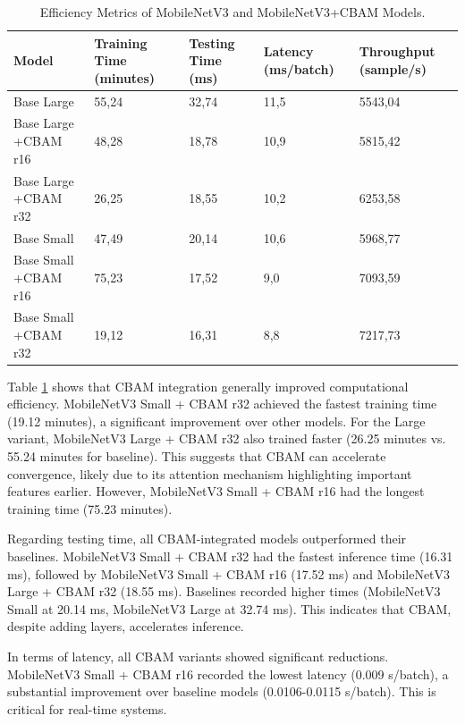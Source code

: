 \documentclass[preprint,12pt]{elsarticle}
\begin{document}
\begin{table}[t]
    \centering
    \begin{tabularx}{\textwidth}{|X|X|X|X|X|}
        \hline
        \textbf{Model} & \textbf{Training Time (minutes)} & \textbf{Testing Time (ms)} & \textbf{Latency (ms/batch)} & \textbf{Throughput (sample/s)} \\
        \hline
        Base Large & 55,24 & 32,74 & 11,5 & 5543,04 \\
        Base Large +CBAM r16 & 48,28 & 18,78 & 10,9 & 5815,42 \\
        Base Large +CBAM r32 & 26,25 & 18,55 & 10,2 & 6253,58 \\
        \hline
        Base Small & 47,49 & 20,14 & 10,6 & 5968,77 \\
        Base Small +CBAM r16 & 75,23 & 17,52 & 9,0 & 7093,59 \\
        Base Small +CBAM r32 & 19,12 & 16,31 & 8,8 & 7217,73 \\
        \hline
    \end{tabularx}
    \caption{Efficiency Metrics of MobileNetV3 and MobileNetV3+CBAM Models.}
    \label{tab:efficiency-result}
\end{table}

Table \ref{tab:efficiency-result} shows that CBAM integration generally improved computational efficiency. MobileNetV3 Small + CBAM r32 achieved the fastest training time (19.12 minutes), a significant improvement over other models. For the Large variant, MobileNetV3 Large + CBAM r32 also trained faster (26.25 minutes vs. 55.24 minutes for baseline). This suggests that CBAM can accelerate convergence, likely due to its attention mechanism highlighting important features earlier. However, MobileNetV3 Small + CBAM r16 had the longest training time (75.23 minutes).

Regarding testing time, all CBAM-integrated models outperformed their baselines. MobileNetV3 Small + CBAM r32 had the fastest inference time (16.31 ms), followed by MobileNetV3 Small + CBAM r16 (17.52 ms) and MobileNetV3 Large + CBAM r32 (18.55 ms). Baselines recorded higher times (MobileNetV3 Small at 20.14 ms, MobileNetV3 Large at 32.74 ms). This indicates that CBAM, despite adding layers, accelerates inference.

In terms of latency, all CBAM variants showed significant reductions. MobileNetV3 Small + CBAM r16 recorded the lowest latency (0.009 s/batch), a substantial improvement over baseline models (0.0106-0.0115 s/batch). This is critical for real-time systems.
\end{document}
